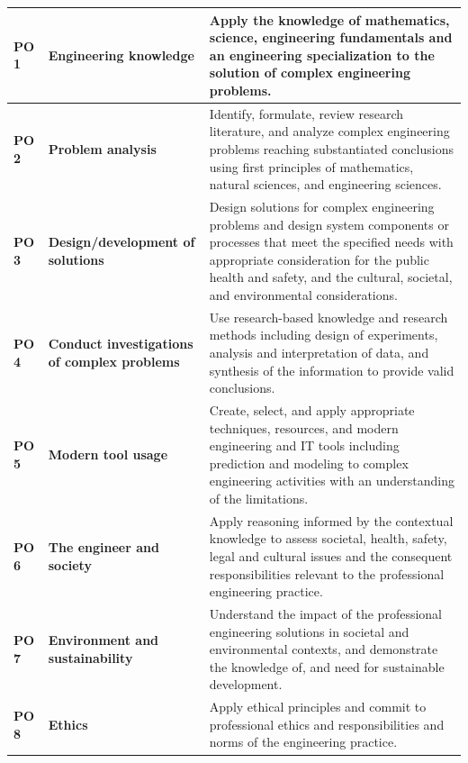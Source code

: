 \documentclass[12pt,a4paper]{report}
\begin{document}
{\fontsize{9.5}{12.5}\selectfont
\renewcommand{\arraystretch}{1.08}
\setlength{\tabcolsep}{5pt}
\noindent\begin{tabular}{|p{}|p{}|p{}|}
\hline
\textbf{PO 1}  & \textbf{Engineering knowledge}         & Apply the knowledge of mathematics, science, engineering fundamentals and an engineering specialization to the solution of complex engineering problems. \\
\hline
\textbf{PO 2}  & \textbf{Problem analysis}               & Identify, formulate, review research literature, and analyze complex engineering problems reaching substantiated conclusions using first principles of mathematics, natural sciences, and engineering sciences. \\
\hline
\textbf{PO 3}  & \textbf{Design/development of solutions}& Design solutions for complex engineering problems and design system components or processes that meet the specified needs with appropriate consideration for the public health and safety, and the cultural, societal, and environmental considerations. \\
\hline
\textbf{PO 4}  & \textbf{Conduct investigations of complex problems} & Use research-based knowledge and research methods including design of experiments, analysis and interpretation of data, and synthesis of the information to provide valid conclusions. \\
\hline
\textbf{PO 5}  & \textbf{Modern tool usage}              & Create, select, and apply appropriate techniques, resources, and modern engineering and IT tools including prediction and modeling to complex engineering activities with an understanding of the limitations. \\
\hline
\textbf{PO 6}  & \textbf{The engineer and society}       & Apply reasoning informed by the contextual knowledge to assess societal, health, safety, legal and cultural issues and the consequent responsibilities relevant to the professional engineering practice. \\
\hline
\textbf{PO 7}  & \textbf{Environment and sustainability} & Understand the impact of the professional engineering solutions in societal and environmental contexts, and demonstrate the knowledge of, and need for sustainable development. \\
\hline
\textbf{PO 8}  & \textbf{Ethics}                         & Apply ethical principles and commit to professional ethics and responsibilities and norms of the engineering practice. \\

\end{tabular}}
\end{document}
